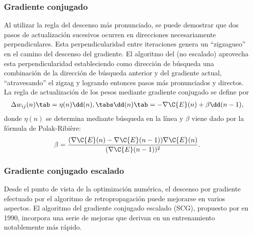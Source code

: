 \subsubsection{Gradiente conjugado}
%
Al utilizar la regla del descenso más pronunciado, se puede demostrar
que dos pasos de actualización sucesivos ocurren en direcciones
necesariamente perpendiculares.
Esta perpendicularidad entre iteraciones genera un ``zigzagueo'' en el
camino del descenso del gradiente. El algoritmo del  (no escalado) aprovecha esta perpendicularidad
estableciendo como dirección de búsqueda una combinación de la
dirección de búsqueda anterior y del gradiente actual, ``atravesando''
el zigzag y logrando entonces pasos más pronunciados y directos.
La regla de actualización de los pesos mediante gradiente conjugado
se define por
%
\begin{align}\label{e2:delta-rule-conjugate}
  \Delta w_{ij}(n)\tab=\eta(n)\dd(n),
  \tabs \dd(n)\tab=-\nabla{\C{E}(n)}+\beta\dd(n-1),
\end{align}
%
donde $\eta(n)$ se determina mediante búsqueda en la línea y
$\beta$ viene dado por la fórmula de Polak-Ribière:
%
\begin{align}\label{e2:polak-ribiere}
  \beta=
  \frac{(\nabla{\C{E}(n)}-\nabla{\C{E}(n-1)})\nabla{\C{E}(n)}}{(\nabla{\C{E}(n-1)})^2}.
\end{align}
%
%
\subsubsection{Gradiente conjugado escalado}
%
Desde el punto de vista de la optimización numérica, el descenso por
gradiente efectuado por el algoritmo de retropropagación puede
mejorarse en varios aspectos.  El algoritmo del gradiente conjugado
escalado (SCG), propuesto por \cite{scg} en 1990, incorpora una serie
de mejoras que derivan en un entrenamiento notablemente más rápido.

